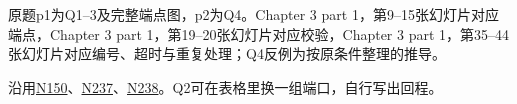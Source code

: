 

原题p1为Q1–3及完整端点图，p2为Q4。Chapter 3 part 1，第9–15张幻灯片对应端点，Chapter 3 part 1，第19–20张幻灯片对应校验，Chapter 3 part 1，第35–44张幻灯片对应编号、超时与重复处理；Q4反例为按原条件整理的推导。


沿用\href{https://crazyshout.github.io/micro-course/cards.html\#CS5222-N150}{N150}、\href{https://crazyshout.github.io/micro-course/cards.html\#CS5222-N237}{N237}、\href{https://crazyshout.github.io/micro-course/cards.html\#CS5222-N238}{N238}。Q2可在表格里换一组端口，自行写出回程。
